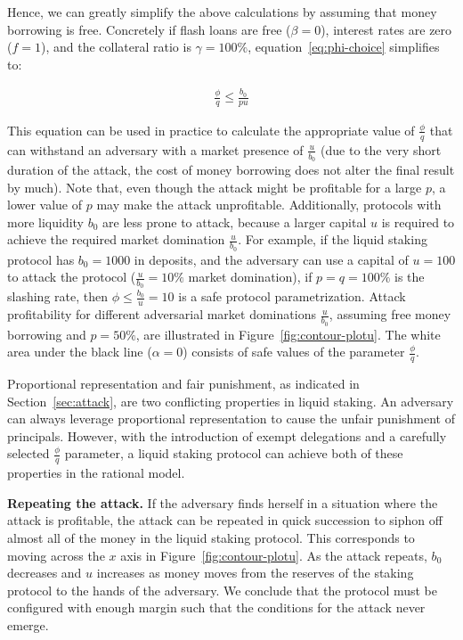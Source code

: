 Hence, we can greatly simplify the above calculations by assuming that money borrowing is free.
Concretely if flash loans are free ($\beta = 0$), interest rates are zero ($f = 1$),
and the collateral ratio is $\gamma = 100\%$, equation~\eqref{eq:phi-choice} simplifies to:

\begin{gather*}
  \frac{\phi}{q} \leq \frac{b_0}{pu} \label{eq:phi-choice-simple}
\end{gather*}

This equation can be used in practice to calculate the appropriate value
of $\frac{\phi}{q}$ that can withstand an adversary with a market presence of $\frac{u}{b_0}$
(due to the very short duration of the attack, the cost of money borrowing does not alter
the final result by much). Note that, even though the attack might be profitable for a
large $p$, a lower value of $p$ may make the attack unprofitable.
Additionally, protocols with more liquidity $b_0$ are less prone to attack,
because a larger capital $u$ is required to achieve the required market domination
$\frac{u}{b_0}$.
For example, if the liquid staking protocol has $b_0 = 1000$ \asset in deposits,
and the adversary can use a capital of $u = 100$ \asset to attack the protocol
($\frac{u}{b_0} = 10\%$ market domination),
if $p = q = 100\%$ is the slashing rate, then $\phi \leq \frac{b_0}{u} = 10$
is a safe protocol parametrization. Attack profitability for different adversarial
market dominations $\frac{u}{b_0}$, assuming free money borrowing and $p = 50\%$,
are illustrated in Figure~\ref{fig:contour-plotu}.
The white area under the black line ($\alpha = 0$) consists of safe values
of the parameter $\frac{\phi}{q}$.

Proportional representation and fair punishment, as indicated in
Section~\ref{sec:attack}, are two conflicting properties in liquid
staking. An adversary can always leverage proportional
representation to cause the unfair punishment of principals.
However, with the introduction of exempt delegations and a carefully selected
$\frac{\phi}{q}$ parameter, a liquid staking protocol can achieve both of these
properties in the rational model.

\noindent
\textbf{Repeating the attack.} If the adversary finds herself in a situation
where the attack is profitable, the attack can be repeated in quick succession
to siphon off almost all of the money in the liquid staking protocol.
This corresponds to moving across the $x$ axis in Figure~\ref{fig:contour-plotu}.
As the attack repeats, $b_0$ decreases and $u$ increases as money moves from
the reserves of the staking protocol to the hands of the adversary.
We conclude that the protocol must be configured with enough margin
such that the conditions for the attack never emerge.

